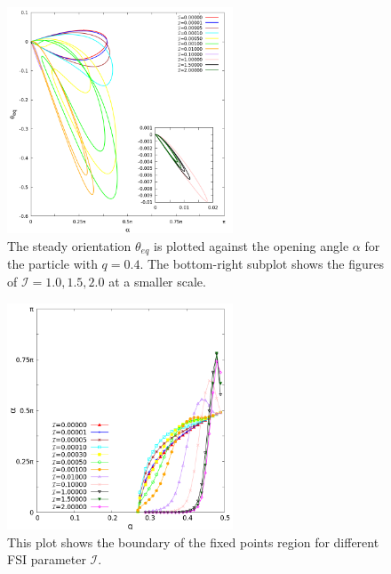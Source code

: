 \documentclass[a4paper,12pt]{report}
\begin{document}
\begin{figure}[!h]
	\begin{center}
		\includegraphics[width=0.6\textwidth]{plot/elastic_beam_alpha_theta_eq_q_0.400.png}
		\caption{The steady orientation $\theta_{eq}$ is plotted against  the opening angle $\alpha$ for the particle with $q = 0.4$. The bottom-right subplot shows the figures of $\mathcal{I}=1.0, 1.5, 2.0$ at a smaller scale.}
		\label{fig:14}
	\end{center}
\end{figure}
\begin{figure}[!h]
	\begin{center}
		\includegraphics[width=0.6\textwidth]{plot/RESLT_q_alpha_plot/elastic_beam_general.png}
		\caption{This plot shows the boundary of the fixed points region for different FSI parameter $\mathcal{I}$.}
		\label{fig:15}
	\end{center}
\end{figure}
\end{document}
